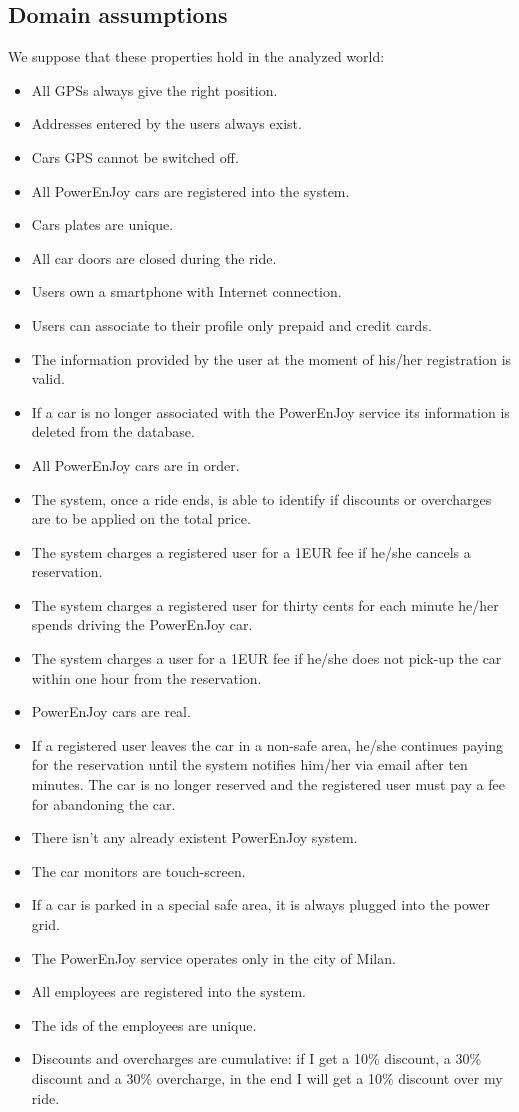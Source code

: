 \subsection{Domain assumptions}
\label{Domain_properties}
We suppose that these properties hold in the analyzed world:
\begin{itemize}
	\item All GPSs always give the right position.
	\item Addresses entered by the users always exist.
	\item Cars GPS cannot be switched off.
	\item All PowerEnJoy cars are registered into the system.
	\item Cars plates are unique.
	\item All car doors are closed during the ride.
	\item Users own a smartphone with Internet connection.
	\item Users can associate to their profile only prepaid and credit cards.
	\item The information provided by the user at the moment of his/her registration is valid.
	\item If a car is no longer associated with the PowerEnJoy service its information is deleted from the database.
	\item All PowerEnJoy cars are in order.
	\item The system, once a ride ends, is able to identify if discounts or overcharges are to be applied on the total price.
	\item The system charges a registered user for a 1EUR fee if he/she cancels a reservation.
	\item The system charges a registered user for thirty cents for each minute he/her spends driving the PowerEnJoy car. 
	\item The system charges a user for a 1EUR fee if he/she does not pick-up the car within one hour from the reservation. 
	\item PowerEnJoy cars are real.
	\item If a registered user leaves the car in a non-safe area, he/she continues paying for the reservation until the system notifies him/her via email after ten minutes. The car is no longer reserved and the registered user must pay a fee for abandoning the car.
	\item There isn't any already existent PowerEnJoy system.
	\item The car monitors are touch-screen.
	\item If a car is parked in a special safe area, it is always plugged into the power grid.
	\item The PowerEnJoy service operates only in the city of Milan.
	\item All employees are registered into the system.
	\item The ids of the employees are unique.
	\item Discounts and overcharges are cumulative: if I get a 10\% discount, a 30\% discount and a 30\% overcharge, in the end I will get a 10\% discount over my ride.
\end{itemize}
\newpage
